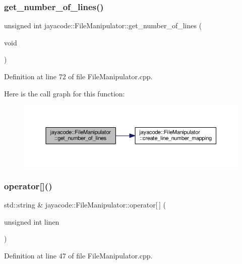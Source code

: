 \subsubsection{\texorpdfstring{get\+\_\+number\+\_\+of\+\_\+lines()}{get\_number\_of\_lines()}}
{\footnotesize\ttfamily unsigned int jayacode\+::\+File\+Manipulator\+::get\+\_\+number\+\_\+of\+\_\+lines (\begin{DoxyParamCaption}\item[{void}]{ }\end{DoxyParamCaption})}



Definition at line 72 of file File\+Manipulator.\+cpp.

Here is the call graph for this function\+:
\nopagebreak
\begin{figure}[H]
\begin{center}
\leavevmode
\includegraphics[width=350pt]{classjayacode_1_1_file_manipulator_a9a8ca423c0ed325ff440ac5996aa0f3a_cgraph}
\end{center}
\end{figure}
\mbox{\label{classjayacode_1_1_file_manipulator_a826ec04085638ec37ea29a43b895152c}} 
\subsubsection{\texorpdfstring{operator[]()}{operator[]()}}
{\footnotesize\ttfamily std\+::string \& jayacode\+::\+File\+Manipulator\+::operator\mbox{[}$\,$\mbox{]} (\begin{DoxyParamCaption}\item[{unsigned int}]{linen }\end{DoxyParamCaption})}



Definition at line 47 of file File\+Manipulator.\+cpp.

